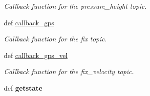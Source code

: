 \begin{DoxyCompactItemize}
\begin{DoxyCompactList}\small\item\em \-Callback function for the pressure\-\_\-height topic. \end{DoxyCompactList}\item 
\hypertarget{classspiri__api_1_1get__state_1_1_staterobot_a42ec392a4f4512781f3a9c0926fdb175}{def \hyperlink{classspiri__api_1_1get__state_1_1_staterobot_a42ec392a4f4512781f3a9c0926fdb175}{callback\-\_\-gps}}\label{classspiri__api_1_1get__state_1_1_staterobot_a42ec392a4f4512781f3a9c0926fdb175}

\begin{DoxyCompactList}\small\item\em \-Callback function for the fix topic. \end{DoxyCompactList}\item 
\hypertarget{classspiri__api_1_1get__state_1_1_staterobot_a9a9c3e465592be5e619fe5a68a6563a0}{def \hyperlink{classspiri__api_1_1get__state_1_1_staterobot_a9a9c3e465592be5e619fe5a68a6563a0}{callback\-\_\-gps\-\_\-vel}}\label{classspiri__api_1_1get__state_1_1_staterobot_a9a9c3e465592be5e619fe5a68a6563a0}

\begin{DoxyCompactList}\small\item\em \-Callback function for the fix\-\_\-velocity topic. \end{DoxyCompactList}\item 
\hypertarget{classspiri__api_1_1get__state_1_1_staterobot_af7dfad7d8aed3e97870fb120b8934a59}{def {\bfseries getstate}}\label{classspiri__api_1_1get__state_1_1_staterobot_af7dfad7d8aed3e97870fb120b8934a59}


\end{DoxyCompactItemize}
